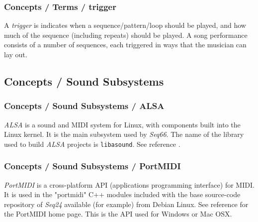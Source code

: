 \subsubsection{Concepts / Terms / trigger}
\label{subsubsec:concepts_terms_trigger}

   A \textsl{trigger} is indicates when a sequence/pattern/loop
   should be played, and how much of the sequence (including repeats) should be
   played.  A song performance consists of a number of sequences, each
   triggered in ways that the musician can lay out.

\subsection{Concepts / Sound Subsystems}
\label{subsec:concepts_sound_subsystems}

\subsubsection{Concepts / Sound Subsystems / ALSA}
\label{subsubsec:concepts_sound_alsa}

   \textsl{ALSA} is a sound and MIDI system for Linux, with components built
   into the Linux kernel. It is the main subsystem used by
   \textsl{Seq66}.  The name of the library used to build
   \textsl{ALSA} projects is \texttt{libasound}.
   See reference \cite{alsa}.

\subsubsection{Concepts / Sound Subsystems / PortMIDI}
\label{subsubsec:concepts_sound_portmidi}

   \textsl{PortMIDI} is a cross-platform API (applications programming
   interface) for MIDI.  It is used in the "portmidi" C++ modules
   included with the base source-code repository of \textsl{Seq24} available
   (for example) from Debian Linux.  See reference \cite{portmidi}
   for the PortMIDI home page.
   This is the API used for Windows or Mac OSX.


